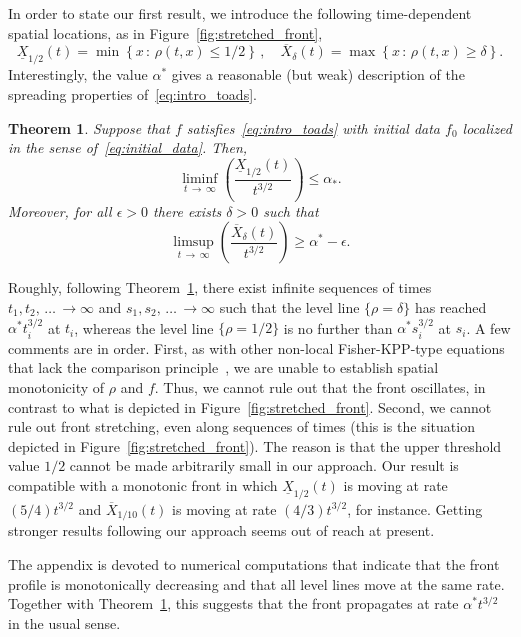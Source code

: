 \documentclass[10pt]{amsart}
\newtheorem{theo}{Theorem}[section]
\theoremstyle{definition}\newtheorem{defi}[theo]{Definition}\newtheorem{rema}[theo]{Remark}\newtheorem{exam}[theo]{Example}\newtheorem{exem}[theo]{Example}\newtheorem{nota}[theo]{Notation}
\newcommand{\1}{\mathds{1}}
\newcommand{\e}{\epsilon}
\begin{document}
In order to state our first result, we introduce the following time-dependent spatial locations, as in Figure~\ref{fig:stretched_front},
\[
\underline{X}_{1/2}(t) = \min\left\{x\,:\,\rho(t,x) \leq 1/2\right\} \,, \quad \overline{X}_{\delta}(t) = \max\left\{x\,:\,\rho(t,x) \geq \delta\right\}.
\]
Interestingly, the value $\alpha^*$ gives a reasonable (but weak) description of the spreading properties of~\eqref{eq:intro_toads}.


\begin{theo}\label{thm:propagation}
Suppose that $f$ satisfies~\eqref{eq:intro_toads} with initial data $f_0$ localized in the sense of~\eqref{eq:initial_data}. Then,
\[
\liminf_{t\,\to\,\infty} \left(\frac{\underline{X}_{1/2}(t)}{t^{3/2}}\right) \leq \alpha_*.
\]
Moreover, for all $\e>0$ there exists $\delta>0$ such that
\begin{equation}\label{eq:lower_bound}
\limsup_{t\,\to\,\infty} \left(\frac{\overline{X}_{\delta}(t)}{t^{3/2}}\right) \geq \alpha^* - \e.
\end{equation}
\end{theo}


Roughly, following Theorem~\ref{thm:propagation}, there exist infinite sequences of times $t_1, t_2, \,\dots\,\to \infty$ and $s_1,s_2,\,\dots\,\to\infty$ such that the level line $\{\rho = \delta\}$ has reached $\alpha^* t_i^{3/2}$ at $t_i$, whereas the level line $\{\rho = 1/2\}$ is no further than $\alpha^* s_i^{3/2}$ at $s_i$. A few comments are in order. First, as with other non-local Fisher-KPP-type equations that lack the comparison principle~\cite{berestycki_non-local_2009}, we are unable to establish spatial monotonicity of $\rho$ and $f$. Thus, we cannot rule out that the front oscillates, in contrast to what is depicted in Figure~\ref{fig:stretched_front}. Second, we cannot rule out front stretching, even along sequences of times (this is the situation depicted in Figure~\ref{fig:stretched_front}). The reason is that the upper threshold value $1/2$ cannot be made arbitrarily small in our approach. Our result is compatible with a monotonic front in which $\underline{X}_{1/2}(t)$ is moving at rate $(5/4)t^{3/2}$ and $\overline{X}_{1/10}(t)$ is moving at rate $(4/3)t^{3/2}$, for instance. Getting stronger results following our approach seems out of reach at present.

The appendix is devoted to numerical computations that indicate that the front profile is monotonically decreasing and that all level lines move at the same rate. Together with Theorem~\ref{thm:propagation}, this suggests that the front propagates at rate $\alpha^* t^{3/2}$ in the usual sense.
\end{document}
